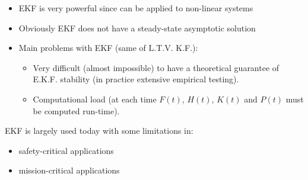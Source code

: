 \begin{remark}
    \begin{itemize}
        \item EKF is very powerful since can be applied to non-linear systems
        \item Obviously EKF does not have a steady-state asymptotic solution
        \item Main problems with EKF (same of L.T.V. K.F.):
        \begin{itemize}
            \item Very difficult (almost impossible) to have a theoretical guarantee of E.K.F. stability (in practice extensive empirical testing).
            \item Computational load (at each time $F(t)$, $H(t)$, $K(t)$ and $P(t)$ must be computed run-time).
        \end{itemize}
    \end{itemize}

    EKF is largely used today with some limitations in:
    \begin{itemize}
        \item safety-critical applications
        \item mission-critical applications
    \end{itemize}
\end{remark}

